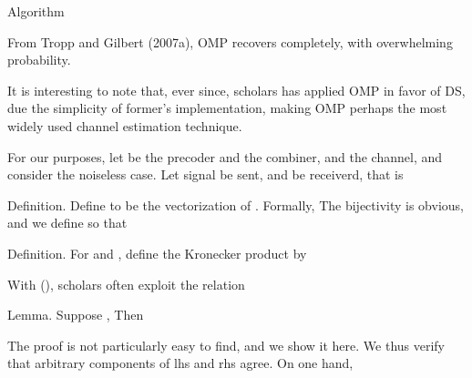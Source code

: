 \Result
{Algorithm}
{
\startitemize[n]
\item \color[red]{(To be done)}
\stopitemize
}
From Tropp and Gilbert (2007a), OMP recovers  completely, with overwhelming probability.

It is interesting to note that, ever since, scholars has applied OMP in favor of DS, due the simplicity of former's implementation, making OMP perhaps the most widely used channel estimation technique.

For our purposes, let  be the precoder and  the combiner, and  the channel, and consider the noiseless case.
Let signal  be sent, and  be receiverd, that is


\Result
{Definition.}
{
Define  to be the vectorization of .
Formally,
The bijectivity is obvious, and we define  so that
}

\Result
{Definition.}
{
For  and , define the Kronecker product  by
}

With (), scholars often exploit the relation

\Result
{Lemma.}
{
Suppose ,
Then
}

The proof is not particularly easy to find, and we show it here.
We thus verify that arbitrary components of lhs and rhs agree.
On one hand,


